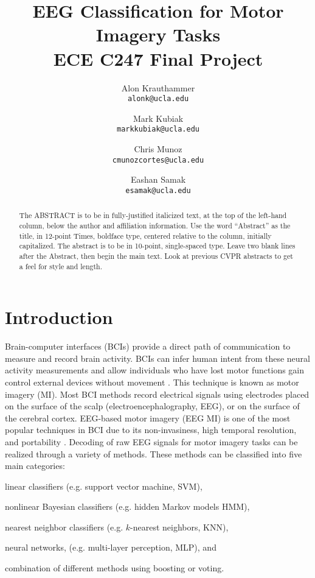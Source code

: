 \documentclass[10pt,twocolumn,letterpaper]{article}
\begin{document}
\title{
    EEG Classification for Motor Imagery Tasks\\
    {\large ECE C247 Final Project}
}

\author{Alon Krauthammer\\
{\tt\small alonk@ucla.edu}
\and
Mark Kubiak\\
{\tt\small markkubiak@ucla.edu}
\and
Chris Munoz\\
{\tt\small cmunozcortes@ucla.edu}
\and
Eashan Samak\\
{\tt\small esamak@ucla.edu}
}

\maketitle

\begin{abstract}
   The ABSTRACT is to be in fully-justified italicized text, at the top
   of the left-hand column, below the author and affiliation
   information. Use the word ``Abstract'' as the title, in 12-point
   Times, boldface type, centered relative to the column, initially
   capitalized. The abstract is to be in 10-point, single-spaced type.
   Leave two blank lines after the Abstract, then begin the main text.
   Look at previous CVPR abstracts to get a feel for style and length.
\end{abstract}

\section{Introduction}
Brain-computer interfaces (BCIs) provide a direct path of communication to
measure and record brain activity. BCIs can infer human intent from these
neural activity measurements and allow individuals who have lost motor
functions gain control external devices without movement \cite{Graimann2010}.
This technique is known as motor imagery (MI).
Most BCI methods record electrical signals using electrodes
placed on the surface of the scalp (electroencephalography, EEG), or on the
surface of the cerebral cortex. EEG-based motor imagery (EEG MI) is one of the
most popular techniques in BCI due to its non-invasiness, high temporal
resolution, and portability \cite{schalk}.
Decoding of raw EEG signals for motor imagery tasks can be realized through a
variety of methods. These methods can be classified into five main categories:
\begin{enumerate*}
    \item linear classifiers (e.g. support vector machine, SVM),
    \item nonlinear Bayesian classifiers (e.g. hidden Markov models HMM),
    \item nearest neighbor classifiers (e.g. $k$-nearest neighbors, KNN),
    \item neural networks, (e.g. multi-layer perception, MLP), and
    \item combination of different methods using boosting or voting.
\end{enumerate*} \cite{wang}
\end{document}
